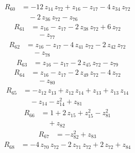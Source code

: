 \begin{equation*}\begin{aligned}
R_{60}&=-12\,z_{14}\,z_{72} +z_{16} -z_{17} -4\,z_{34}\,z_{72} \\
&\quad -2\,z_{36}\,z_{72} -z_{76}
\end{aligned}\end{equation*}
\begin{equation*}\begin{aligned}
R_{61}&=z_{16} -z_{17} -2\,z_{38}\,z_{72} +6\,z_{72} \\
&\quad -z_{77}
\end{aligned}\end{equation*}
\begin{equation*}\begin{aligned}
R_{62}&=z_{16} -z_{17} -4\,z_{41}\,z_{72} -2\,z_{42}\,z_{72} \\
&\quad -z_{78}
\end{aligned}\end{equation*}
\begin{equation*}\begin{aligned}
R_{63}&=z_{16} -z_{17} -2\,z_{45}\,z_{72} -z_{79}
\end{aligned}\end{equation*}
\begin{equation*}\begin{aligned}
R_{64}&=z_{16} -z_{17} -2\,z_{49}\,z_{72} -4\,z_{72} \\
&\quad -z_{80}
\end{aligned}\end{equation*}
\begin{equation*}\begin{aligned}
R_{65}&=-z_{12}\,z_{13} +z_{12}\,z_{14} +z_{13} +z_{13}\,z_{14} \\
&\quad -z_{14} -z_{14}^{2} +z_{81}
\end{aligned}\end{equation*}
\begin{equation*}\begin{aligned}
R_{66}&=1 +2\,z_{15} +z_{15}^{2} -z_{81}^{2} \\
&\quad +z_{82}
\end{aligned}\end{equation*}
\begin{equation*}\begin{aligned}
R_{67}&=-z_{82}^{2} +z_{83}
\end{aligned}\end{equation*}
\begin{equation*}\begin{aligned}
R_{68}&=-4\,z_{70}\,z_{72} -2\,z_{71}\,z_{72} +2\,z_{72} +z_{84}
\end{aligned}\end{equation*}
